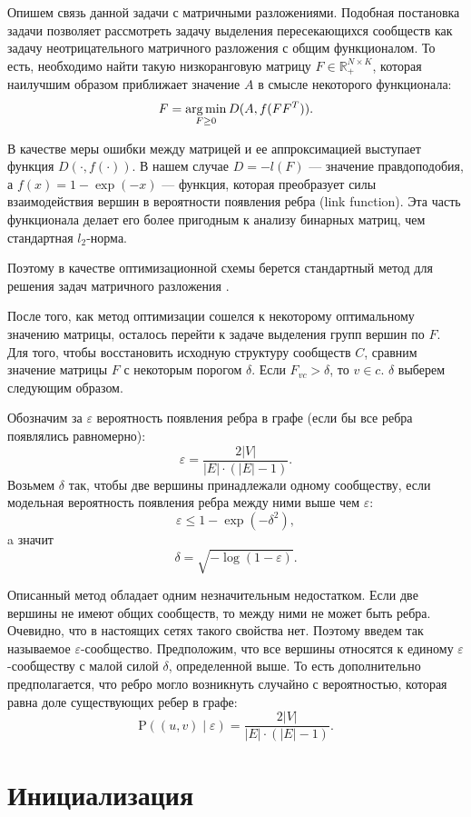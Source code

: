 \documentclass{ITaSconf}
\newcommand{\argmin}{\mathop{\rm arg\,min}\limits}
\def\PP{\mathrm{P}}
\begin{document}
	Опишем связь данной задачи с матричными разложениями.
	Подобная постановка задачи позволяет рассмотреть задачу выделения пересекающихся сообществ как задачу неотрицательного матричного разложения с общим функционалом.
	То есть, необходимо найти такую низкоранговую матрицу $F\in \mathbb{R}_{+}^{N \times K}$, которая наилучшим образом приближает значение $A$ в смысле некоторого функционала:
	$$ F = \argmin_{F\ge 0} D(A, f(F F^T)). $$
	
	В качестве меры ошибки между матрицей и ее аппроксимацией выступает функция $D(\cdot, f(\cdot))$. В нашем случае
	$D = -l(F)$ --- значение правдоподобия, а $f(x) = 1 - \exp(-x)$ --- функция, которая преобразует силы взаимодействия вершин в вероятности появления ребра (link function). Эта часть функционала делает его более пригодным к анализу бинарных матриц, чем стандартная $l_2$-норма.
	
	Поэтому в качестве оптимизационной схемы берется стандартный метод для решения задач матричного разложения \cite{lin2007projected}.
	
	После того, как метод оптимизации сошелся к некоторому оптимальному значению матрицы, осталось перейти к задаче выделения групп вершин по $F$.
	Для того, чтобы восстановить исходную структуру сообществ $C$, сравним значение матрицы $F$ с некоторым порогом $\delta$. Если $F_{vc} > \delta$, то $v \in c$. $\delta$ выберем следующим образом.
	
	Обозначим за $\varepsilon$ вероятность появления ребра в графе (если бы все ребра появлялись равномерно): 
	$$\varepsilon = \dfrac{2|V|}{|E|\cdot (|E|-1)}.$$ 
	Возьмем $\delta$ так, чтобы две вершины принадлежали одному сообществу, если модельная вероятность появления ребра между ними выше чем $\varepsilon$:
	$$\varepsilon \le 1-\exp(-\delta^2),$$
	a значит
	$$\delta = \sqrt{-\log(1-\varepsilon)}. $$
	
	Описанный метод обладает одним незначительным недостатком.
	Если две вершины не имеют общих сообществ, то между ними не может быть ребра.
	Очевидно, что в настоящих сетях такого свойства нет.
	Поэтому введем так называемое $\varepsilon$-сообщество.
	Предположим, что все вершины относятся к единому $\varepsilon$-сообществу с малой силой $\delta$, определенной выше.
	То есть дополнительно предполагается, что ребро могло возникнуть случайно с вероятностью, которая равна доле существующих ребер в графе:
	$$ \PP((u,v)\mid \varepsilon) = \dfrac{2|V|}{|E| \cdot \left( |E| - 1 \right)}.$$
	
	\section{Инициализация}
	
\end{document}
